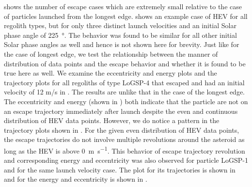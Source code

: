  shows the number of escape cases which are extremely small relative to the case of particles launched from the longest edge.  shows an example case of \gls{HEV} for all regolith types, but for only three distinct launch velocities and an initial Solar phase angle of \SI{225}{\degree}. The behavior was found to be similar for all other initial Solar phase angles as well and hence is not shown here for brevity. Just like for the case of longest edge, we test the relationship between the manner of distribution of data points and the escape behavior and whether it is found to be true here as well. We examine the eccentricity and energy plots and the trajectory plots for all regoliths of type LoGSP-4 that escaped and had an initial velocity of 12 m/s in . The results are unlike that in the case of the longest edge. The eccentricity and energy (shown in ) both indicate that the particle are not on an escape trajectory immediately after launch despite the even and continuous distribution of \gls{HEV} data points. However, we do notice a pattern in the trajectory plots shown in . For the given even distribution of \gls{HEV} data points, the escape trajectories do not involve multiple revolutions around the asteroid as long as the \gls{HEV} is above \SI{0}{\metre\per\second}. This behavior of escape trajectory revolution and corresponding energy and eccentricity was also observed for particle LoGSP-1 and for the same launch velocity case. The plot for its trajectories is shown in  and for the energy and eccentricity is shown in .
